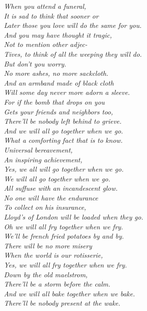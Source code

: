 \begin{commentary}
\begin{multicols}{2}
\small\itshape
When you attend a funeral,\\
It is sad to think that sooner or\\
Later those you love will do the same for you.\\
And you may have thought it tragic,\\
Not to mention other adjec-\\
Tives, to think of all the weeping they will do.\\
But don't you worry.\\
No more ashes, no more sackcloth.\\
And an armband made of black cloth\\
Will some day never more adorn a sleeve.\\
For if the bomb that drops on you\\
Gets your friends and neighbors too,\\
There'll be nobody left behind to grieve.\\[0.5em]
And we will all go together when we go.\\
What a comforting fact that is to know.\\
Universal bereavement,\\
An inspiring achievement,\\
Yes, we all will go together when we go.\\[0.5em]
We will all go together when we go.\\
All suffuse with an incandescent glow.\\
No one will have the endurance\\
To collect on his insurance,\\
Lloyd's of London will be loaded when they go.\\[0.5em]
Oh we will all fry together when we fry.\\
We'll be french fried potatoes by and by.\\
There will be no more misery\\
When the world is our rotisserie,\\
Yes, we will all fry together when we fry.\\[0.5em]
Down by the old maelstrom,\\
There'll be a storm before the calm.\\[0.5em]
And we will all bake together when we bake.\\
There'll be nobody present at the wake.\\

\end{multicols}
\end{commentary}
